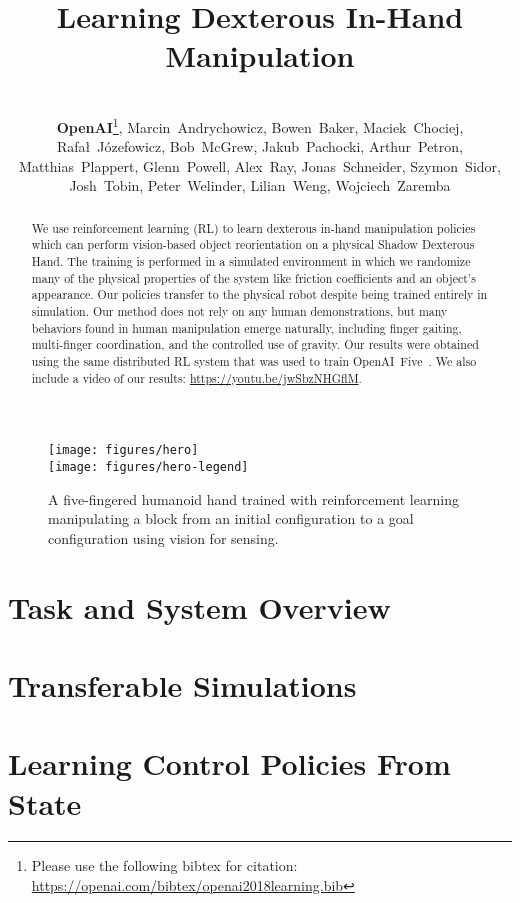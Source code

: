 \documentclass{article}
\title{Learning Dexterous In-Hand Manipulation}
\author{\\
\textbf{OpenAI}\thanks{Please use the following bibtex for citation: \url{https://openai.com/bibtex/openai2018learning.bib}},  Marcin~Andrychowicz, Bowen~Baker, Maciek~Chociej,\\
Rafał~Józefowicz, Bob~McGrew, Jakub~Pachocki, Arthur~Petron,\\
Matthias~Plappert, Glenn~Powell, Alex~Ray, Jonas~Schneider, Szymon~Sidor, \\
Josh~Tobin, Peter~Welinder, Lilian~Weng, Wojciech~Zaremba
}
\begin{document}
\maketitle

\begin{figure}[h!]
\centering
\texttt{[image: figures/hero]} \\ \vspace{0.3cm}
\texttt{[image: figures/hero-legend]} \\ \vspace{0.1cm}
\caption{A five-fingered humanoid hand trained with reinforcement learning manipulating a block from an initial configuration to a goal configuration using vision for sensing.}
\end{figure}



\begin{abstract}
We use reinforcement learning (RL) to learn dexterous in-hand manipulation
policies which can perform vision-based object reorientation on a physical
Shadow Dexterous Hand.
The training is performed in a simulated environment
in which we randomize many of the physical properties of the system like
friction coefficients and an object's appearance.
Our policies transfer to the physical robot
despite being trained entirely in simulation.
Our method does not rely on any human demonstrations, but many behaviors found in human manipulation emerge naturally, including finger gaiting, multi-finger coordination, and
the controlled use of gravity.
Our results were obtained using the same distributed RL system
that was used to train OpenAI~Five~\citep{five}.
We also include a video of our results: \url{https://youtu.be/jwSbzNHGflM}.
\end{abstract}

\startcontents[mainsections]




\section{Task and System Overview}
\label{sec:setup}


\section{Transferable Simulations}
\label{sec:randomizations}



\section{Learning Control Policies From State}
\label{sec:train-policy}

\end{document}
